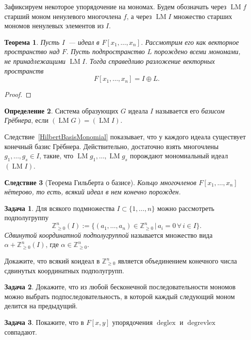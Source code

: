 \documentclass[a4paper,reqno,12pt]{amsart}
\theoremstyle{plain}
\newtheorem{theorem}{Теорема}[section]
\newtheorem{corollary}[theorem]{Следствие}
\theoremstyle{remark}
\theoremstyle{definition}
\newtheorem{definition}[theorem]{Определение}
\newtheorem{problem}{Задача}[section]
\renewcommand{\ge}{\geqslant}
\DeclareMathOperator{\lm}{LM}
\DeclareMathOperator{\deglex}{deglex}
\DeclareMathOperator{\degrevlex}{degrevlex}
\newcommand{\Z}{\mathbb{Z}}
\newcommand{\Zplusn}{\Z_{\ge 0}^n}
\begin{document}
Зафиксируем некоторое упорядочение на мономах.
Будем обозначать через $\lm f$ старший моном ненулевого многочлена $f$, а через $\lm I$ множество
старших мономов ненулевых элементов из $I$.

\begin{theorem}
Пусть $I$~--- идеал в $F[x_1, \ldots, x_n]$. Рассмотрим его как векторное пространство над $F$.
Пусть подпространство $L$ порождено всеми мономами, не принадлежащими $\lm I$.
Тогда справедливо разложение векторных пространств
$$
 F[x_1, \ldots, x_n] = I \oplus L.
$$
\end{theorem}
\begin{proof}

\end{proof}


\begin{definition}
Система образующих $G$ идеала $I$ называется его \emph{базисом Грёбнера}, если $(\lm G) = (\lm I)$. 
\end{definition}

Следствие~\ref{HilbertBasisMonomial} показывает, что у каждого идеала существует конечный базис Грёбнера.
Действительно, достаточно взять многочлены $g_1, \ldots, g_s \in I$, такие, 
что $\lm g_1, \ldots, \lm g_s$ порождают мономиальный идеал $(\lm I)$.

\begin{corollary}[Теорема Гильберта о базисе]
Кольцо многочленов $F[x_1, \ldots, x_n]$ нётерово, то есть, всякий идеал в нем конечно порожден.
\end{corollary}


\bigskip


\begin{problem}
Для всякого подмножества $I \subset \{1, \ldots, n\}$ можно рассмотреть подполугруппу 
$$
 \Zplusn(I) := \{(a_1, \ldots, a_n) \in \Zplusn \, | \, a_i = 0 \, \forall\, i \in I \}.
$$
\emph{Сдвинутой координатной подполугруппой} называется множество вида $\alpha + \Zplusn(I)$, где $\alpha \in \Zplusn$.

Докажите, что всякий коидеал в $\Zplusn$ является объединением конечного числа сдвинутых координатных подполугрупп.
\end{problem}


\begin{problem}
Докажите, что из любой бесконечной последовательности мономов можно выбрать подпоследовательность,
в которой каждый следующий моном делится на предыдущий.
\end{problem}

\begin{problem}
Покажите, что в $F[x,y]$ упорядочения $\deglex$ и $\degrevlex$ совпадают.
\end{problem}
\end{document}
